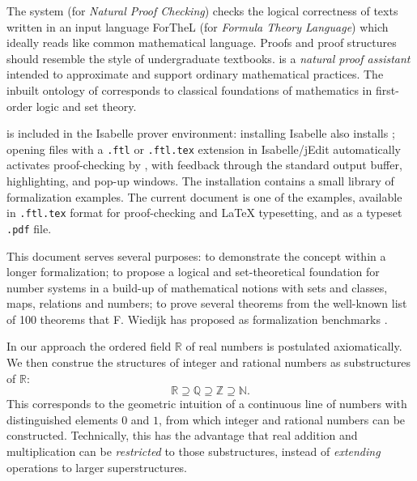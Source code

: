 \documentclass{article}
\begin{document}
The \Naproche{} system (for \emph{Natural Proof Checking})
checks the logical correctness of texts
written in an input language ForTheL (for \emph{Formula Theory Language})
which ideally reads like common mathematical language. Proofs and proof
structures should resemble the
style of undergraduate textbooks.
\Naproche{} is a \emph{natural proof assistant} intended to
approximate and support ordinary mathematical practices.
The inbuilt ontology of \Naproche{} corresponds to classical foundations
of mathematics in first-order logic and set theory.

\Naproche{} is included in the Isabelle prover environment: installing Isabelle
also installs \Naproche{}; opening files with a \verb+.ftl+ or \verb+.ftl.tex+
extension in Isabelle/jEdit automatically activates proof-checking by \Naproche{},
with feedback through the standard output buffer, highlighting, and
pop-up windows. The \Naproche{} installation contains a small library of
formalization examples. The current document is one of the examples, available
in \verb+.ftl.tex+ format for proof-checking and \LaTeX{} typesetting, and
as a typeset \verb+.pdf+ file.

This document serves several purposes: to demonstrate the
\Naproche{} concept  within a longer formalization;
to propose a logical and set-theoretical foundation for
number systems in a build-up of mathematical notions
with sets and classes, maps, relations and numbers;
to prove several theorems from the well-known list of 100 theorems
that F. Wiedijk has proposed as formalization benchmarks \cite{Wiedijk_100Theorems}.

In our approach the ordered field $\mathbb{R}$ of real numbers
is postulated axiomatically. We then construe the structures of integer and
rational numbers as substructures of $\mathbb{R}$:
\[ \mathbb{R} \supseteq \mathbb{Q} \supseteq \mathbb{Z}
\supseteq \mathbb{N}. \]
This corresponds to the
geometric intuition of a continuous line of numbers with
distinguished elements $0$ and $1$, from which integer and rational numbers can
be constructed. Technically, this has the advantage
that real addition and multiplication
can be {\em restricted} to those substructures, instead of {\em extending} operations
to larger superstructures.
\end{document}
